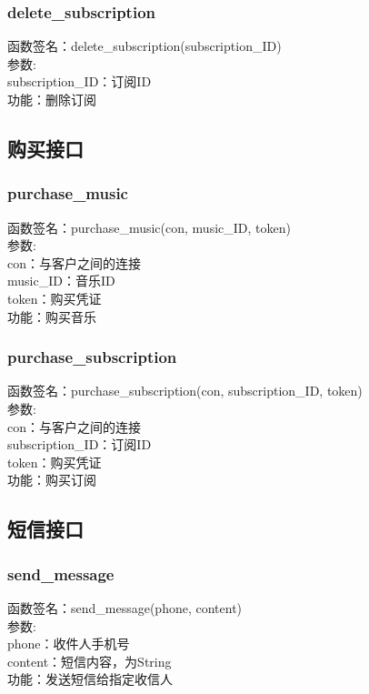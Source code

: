 \subsubsection{delete\_subscription}
\noindent
函数签名：delete\_subscription(subscription\_ID)\\
参数:\\
subscription\_ID：订阅ID\\
功能：删除订阅

\subsection{购买接口}

\subsubsection{purchase\_music}
\noindent
函数签名：purchase\_music(con, music\_ID, token)\\
参数:\\
con：与客户之间的连接\\
music\_ID：音乐ID\\
token：购买凭证\\
功能：购买音乐

\subsubsection{purchase\_subscription}
\noindent
函数签名：purchase\_subscription(con, subscription\_ID, token)\\
参数:\\
con：与客户之间的连接\\
subscription\_ID：订阅ID\\
token：购买凭证\\
功能：购买订阅

\subsection{短信接口}

\subsubsection{send\_message}
\noindent
函数签名：send\_message(phone, content)\\
参数:\\
phone：收件人手机号\\
content：短信内容，为String\\
功能：发送短信给指定收信人

